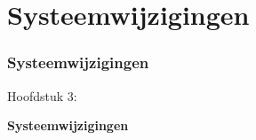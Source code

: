 %

\section{Systeemwijzigingen}
\begin{frame}[fragile]
	\frametitle{Systeemwijzigingen}

	\begin{center}\huge{Hoofdstuk 3:}\end{center}
	\begin{center}\huge{\color{typo3darkgrey}\textbf{Systeemwijzigingen}}\end{center}

\end{frame}


